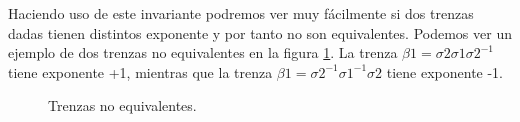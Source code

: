 Haciendo uso de este invariante podremos ver muy fácilmente si dos trenzas dadas tienen distintos exponente y por tanto no son equivalentes. Podemos ver un ejemplo de dos trenzas no equivalentes en la figura \ref{exp2}. La trenza $\beta1 = \sigma2\sigma1\sigma2^{-1}$ tiene exponente +1, mientras que la trenza $\beta1 = \sigma2^{-1}\sigma1^{-1}\sigma2$ tiene exponente -1.\\ 
	\begin{figure}[h!]
		\centering
		\caption{Trenzas no equivalentes.}
		\label{exp2} 
	\end{figure}
	
